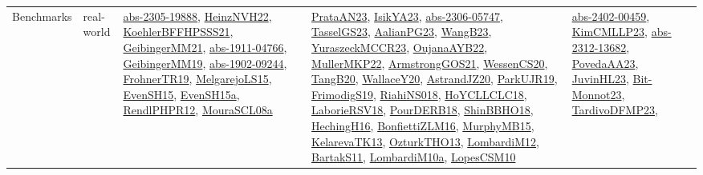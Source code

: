 {\begin{longtable}{lp{3cm}>{\raggedright}p{6cm}>{\raggedright}p{6cm}p{8cm}}
Benchmarks & real-world & \href{articles/abs-2305-19888.pdf}{abs-2305-19888}\cite{abs-2305-19888}, \href{articles/HeinzNVH22.pdf}{HeinzNVH22}\cite{HeinzNVH22}, \href{articles/KoehlerBFFHPSSS21.pdf}{KoehlerBFFHPSSS21}\cite{KoehlerBFFHPSSS21}, \href{papers/GeibingerMM21.pdf}{GeibingerMM21}\cite{GeibingerMM21}, \href{articles/abs-1911-04766.pdf}{abs-1911-04766}\cite{abs-1911-04766}, \href{papers/GeibingerMM19.pdf}{GeibingerMM19}\cite{GeibingerMM19}, \href{articles/abs-1902-09244.pdf}{abs-1902-09244}\cite{abs-1902-09244}, \href{papers/FrohnerTR19.pdf}{FrohnerTR19}\cite{FrohnerTR19}, \href{papers/MelgarejoLS15.pdf}{MelgarejoLS15}\cite{MelgarejoLS15}, \href{papers/EvenSH15.pdf}{EvenSH15}\cite{EvenSH15}, \href{articles/EvenSH15a.pdf}{EvenSH15a}\cite{EvenSH15a}, \href{papers/RendlPHPR12.pdf}{RendlPHPR12}\cite{RendlPHPR12}, \href{papers/MouraSCL08a.pdf}{MouraSCL08a}\cite{MouraSCL08a} & \href{articles/PrataAN23.pdf}{PrataAN23}\cite{PrataAN23}, \href{articles/IsikYA23.pdf}{IsikYA23}\cite{IsikYA23}, \href{articles/abs-2306-05747.pdf}{abs-2306-05747}\cite{abs-2306-05747}, \href{papers/TasselGS23.pdf}{TasselGS23}\cite{TasselGS23}, \href{papers/AalianPG23.pdf}{AalianPG23}\cite{AalianPG23}, \href{papers/WangB23.pdf}{WangB23}\cite{WangB23}, \href{articles/YuraszeckMCCR23.pdf}{YuraszeckMCCR23}\cite{YuraszeckMCCR23}, \href{papers/OujanaAYB22.pdf}{OujanaAYB22}\cite{OujanaAYB22}, \href{articles/MullerMKP22.pdf}{MullerMKP22}\cite{MullerMKP22}, \href{papers/ArmstrongGOS21.pdf}{ArmstrongGOS21}\cite{ArmstrongGOS21}, \href{papers/WessenCS20.pdf}{WessenCS20}\cite{WessenCS20}, \href{papers/TangB20.pdf}{TangB20}\cite{TangB20}, \href{articles/WallaceY20.pdf}{WallaceY20}\cite{WallaceY20}, \href{articles/AstrandJZ20.pdf}{AstrandJZ20}\cite{AstrandJZ20}, \href{papers/ParkUJR19.pdf}{ParkUJR19}\cite{ParkUJR19}, \href{papers/FrimodigS19.pdf}{FrimodigS19}\cite{FrimodigS19}, \href{papers/RiahiNS018.pdf}{RiahiNS018}\cite{RiahiNS018}, \href{papers/HoYCLLCLC18.pdf}{HoYCLLCLC18}\cite{HoYCLLCLC18}, \href{articles/LaborieRSV18.pdf}{LaborieRSV18}\cite{LaborieRSV18}, \href{articles/PourDERB18.pdf}{PourDERB18}\cite{PourDERB18}, \href{articles/ShinBBHO18.pdf}{ShinBBHO18}\cite{ShinBBHO18}, \href{papers/HechingH16.pdf}{HechingH16}\cite{HechingH16}, \href{papers/BonfiettiZLM16.pdf}{BonfiettiZLM16}\cite{BonfiettiZLM16}, \href{papers/MurphyMB15.pdf}{MurphyMB15}\cite{MurphyMB15}, \href{papers/KelarevaTK13.pdf}{KelarevaTK13}\cite{KelarevaTK13}, \href{articles/OzturkTHO13.pdf}{OzturkTHO13}\cite{OzturkTHO13}, \href{articles/LombardiM12.pdf}{LombardiM12}\cite{LombardiM12}, \href{articles/BartakS11.pdf}{BartakS11}\cite{BartakS11}, \href{articles/LombardiM10a.pdf}{LombardiM10a}\cite{LombardiM10a}, \href{articles/LopesCSM10.pdf}{LopesCSM10}\cite{LopesCSM10} & \href{articles/abs-2402-00459.pdf}{abs-2402-00459}\cite{abs-2402-00459}, \href{papers/KimCMLLP23.pdf}{KimCMLLP23}\cite{KimCMLLP23}, \href{articles/abs-2312-13682.pdf}{abs-2312-13682}\cite{abs-2312-13682}, \href{papers/PovedaAA23.pdf}{PovedaAA23}\cite{PovedaAA23}, \href{papers/JuvinHL23.pdf}{JuvinHL23}\cite{JuvinHL23}, \href{papers/Bit-Monnot23.pdf}{Bit-Monnot23}\cite{Bit-Monnot23}, \href{papers/TardivoDFMP23.pdf}{TardivoDFMP23}\cite{TardivoDFMP23}, 
\end{longtable}}
